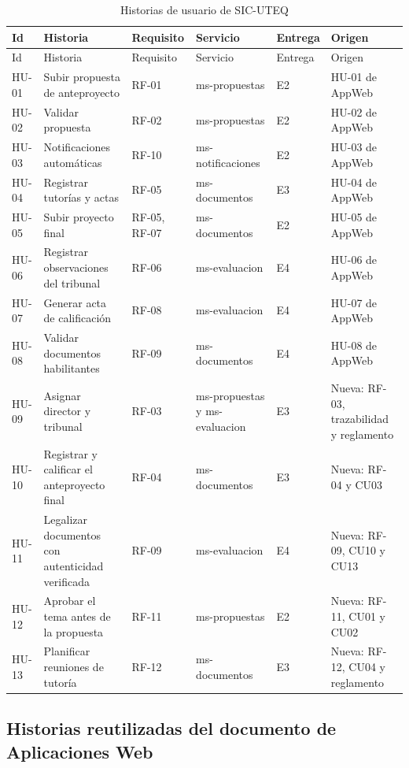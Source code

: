 \begingroup
\footnotesize
\setlength{\tabcolsep}{3pt}
\begin{longtable}{@{}L{1.0cm}L{4.8cm}L{1.7cm}L{3.0cm}L{1.2cm}L{3.0cm}@{}}
\caption{Historias de usuario de SIC-UTEQ}\label{tab:hu}\\
\toprule
Id & Historia & Requisito & Servicio & Entrega & Origen \\
\midrule
\endfirsthead
\toprule
Id & Historia & Requisito & Servicio & Entrega & Origen \\
\midrule
\endhead
\bottomrule
\endfoot
HU-01 & Subir propuesta de anteproyecto & RF-01 & ms-propuestas & E2 & HU-01 de AppWeb \\
HU-02 & Validar propuesta & RF-02 & ms-propuestas & E2 & HU-02 de AppWeb \\
HU-03 & Notificaciones automáticas & RF-10 & ms-notificaciones & E2 & HU-03 de AppWeb \\
HU-04 & Registrar tutorías y actas & RF-05 & ms-documentos & E3 & HU-04 de AppWeb \\
HU-05 & Subir proyecto final & RF-05, RF-07 & ms-documentos & E2 & HU-05 de AppWeb \\
HU-06 & Registrar observaciones del tribunal & RF-06 & ms-evaluacion & E4 & HU-06 de AppWeb \\
HU-07 & Generar acta de calificación & RF-08 & ms-evaluacion & E4 & HU-07 de AppWeb \\
HU-08 & Validar documentos habilitantes & RF-09 & ms-documentos & E4 & HU-08 de AppWeb \\
HU-09 & Asignar director y tribunal & RF-03 & ms-propuestas y ms-evaluacion & E3 & Nueva: RF-03, trazabilidad y reglamento \\
HU-10 & Registrar y calificar el anteproyecto final & RF-04 & ms-documentos & E3 & Nueva: RF-04 y CU03 \\
HU-11 & Legalizar documentos con autenticidad verificada & RF-09 & ms-evaluacion & E4 & Nueva: RF-09, CU10 y CU13 \\
HU-12 & Aprobar el tema antes de la propuesta & RF-11 & ms-propuestas & E2 & Nueva: RF-11, CU01 y CU02 \\
HU-13 & Planificar reuniones de tutoría & RF-12 & ms-documentos & E3 & Nueva: RF-12, CU04 y reglamento \\
\end{longtable}
\endgroup

\subsection{Historias reutilizadas del documento de Aplicaciones Web}

